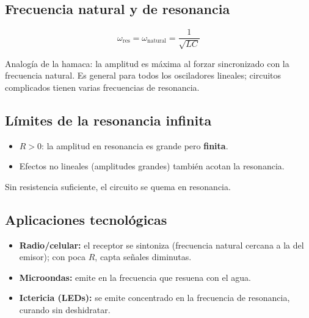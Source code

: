 \documentclass[12pt,a4paper]{article}
\begin{document}
\subsection{Frecuencia natural y de resonancia}

\begin{keybox}[Resonancia]
  \[
  \boxed{\omega_{\text{res}} = \omega_{\text{natural}} = \frac{1}{\sqrt{LC}}}
  \]
\end{keybox}

Analogía de la hamaca: la amplitud es máxima al forzar sincronizado con la
frecuencia natural. Es general para todos los osciladores lineales; circuitos
complicados tienen varias frecuencias de resonancia.

\subsection{Límites de la resonancia infinita}

\begin{itemize}[nosep]
  \item $R > 0$: la amplitud en resonancia es grande pero \textbf{finita}.
  \item Efectos no lineales (amplitudes grandes) también acotan la resonancia.
\end{itemize}

\begin{warnbox}[Se quema]
  Sin resistencia suficiente, el circuito se quema en resonancia.
\end{warnbox}

\subsection{Aplicaciones tecnológicas}

\begin{itemize}[nosep]
  \item \textbf{Radio/celular:} el receptor se sintoniza (frecuencia natural
        cercana a la del emisor); con poca $R$, capta señales diminutas.
  \item \textbf{Microondas:} emite en la frecuencia que resuena con el agua.
  \item \textbf{Ictericia (LEDs):} se emite concentrado en la frecuencia de
        resonancia, curando sin deshidratar.
\end{itemize}



\end{document}
